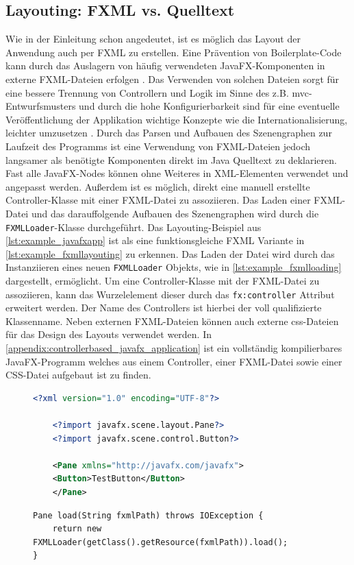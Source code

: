 \subsection{Layouting: FXML vs. Quelltext}
Wie in der Einleitung schon angedeutet, ist es möglich das Layout der Anwendung auch per FXML zu erstellen. Eine Prävention von Boilerplate-Code kann durch das Auslagern von häufig verwendeten JavaFX-Komponenten in externe FXML-Dateien erfolgen \cite{Kruk2018}. Das Verwenden von solchen Dateien sorgt für eine bessere Trennung von Controllern und Logik im Sinne des z.B. \ac{mvc}-Entwurfsmusters \cite{Juneau2013} und durch die hohe Konfigurierbarkeit sind für eine eventuelle Veröffentlichung der Applikation wichtige Konzepte wie die Internationalisierung, leichter umzusetzen \cite{Steyer2014}. Durch das Parsen und Aufbauen des Szenengraphen zur Laufzeit des Programms ist eine Verwendung von FXML-Dateien jedoch langsamer als benötigte Komponenten direkt im Java Quelltext zu deklarieren. Fast alle JavaFX-Nodes können ohne Weiteres in XML-Elementen verwendet und angepasst werden. Außerdem ist es möglich, direkt eine manuell erstellte Controller-Klasse mit einer FXML-Datei zu assoziieren. Das Laden einer FXML-Datei und das darauffolgende Aufbauen des Szenengraphen wird durch die \texttt{FXMLLoader}-Klasse durchgeführt. Das Layouting-Beispiel aus \autoref{lst:example_javafxapp} ist als eine funktionsgleiche FXML Variante in \autoref{lst:example_fxmllayouting} zu erkennen. Das Laden der Datei wird durch das Instanziieren eines neuen \texttt{FXMLLoader} Objekts, wie in \autoref{lst:example_fxmlloading} dargestellt, ermöglicht.
\noindent Um eine Controller-Klasse mit der FXML-Datei zu assoziieren, kann das Wurzelelement dieser durch das \texttt{fx:controller} Attribut erweitert werden. Der Name des Controllers ist hierbei der voll qualifizierte Klassenname. Neben externen FXML-Dateien können auch externe \ac{css}-Dateien für das Design des Layouts verwendet werden. In \autoref{appendix:controllerbased_javafx_application} ist ein vollständig kompilierbares JavaFX-Programm welches aus einem Controller, einer FXML-Datei sowie einer CSS-Datei aufgebaut ist zu finden.

\begin{figure}[H]
	\begin{lstlisting}[caption={Beispiel -- FXML Layouting.}, captionpos=b, label=lst:example_fxmllayouting, language=XML]
	<?xml version="1.0" encoding="UTF-8"?>
	
	<?import javafx.scene.layout.Pane?>
	<?import javafx.scene.control.Button?>
	
	<Pane xmlns="http://javafx.com/javafx">
	<Button>TestButton</Button>
	</Pane>
	\end{lstlisting}
\end{figure}
\begin{figure}[H]
	\begin{lstlisting}[caption={Beispiel -- FXML Ladeprozess.}, captionpos=b, label=lst:example_fxmlloading]
Pane load(String fxmlPath) throws IOException {
	return new FXMLLoader(getClass().getResource(fxmlPath)).load();
}
	\end{lstlisting}
\end{figure}

